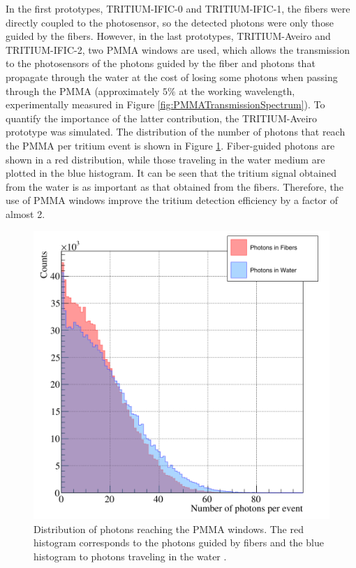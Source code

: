 In the first prototypes, TRITIUM-IFIC-0 and TRITIUM-IFIC-1, the fibers were directly coupled to the photosensor, so the detected photons were only those guided by the fibers. However, in the last prototypes, TRITIUM-Aveiro and TRITIUM-IFIC-2, two PMMA windows are used, which allows the transmission to the photosensors of the photons guided by the fiber and photons that propagate through the water at the cost of losing some photons when passing through the PMMA (approximately $5\%$ at the working wavelength, experimentally measured in Figure \ref{fig:PMMATransmissionSpectrum}). To quantify the importance of the latter contribution, the TRITIUM-Aveiro prototype was simulated. The distribution of the number of photons that reach the PMMA per tritium event is shown in Figure \ref{fig:PMMAEffect}. Fiber-guided photons are shown in a red distribution, while those traveling in the water medium are plotted in the blue histogram. It can be seen that the tritium signal obtained from the water is as important as that obtained from the fibers. Therefore, the use of PMMA windows improve the tritium detection efficiency by a factor of almost 2.

\begin{figure}[hbtp]
\centering
\includegraphics[scale=0.3]{Figures/8SimulationsResults/81TRITIUMDesign/815PMMA/PhotonsDetectedWaterFiber.png}
\caption{Distribution of photons reaching the PMMA windows. The red histogram corresponds to the photons guided by fibers and the blue histogram to photons traveling in the water \cite{SimulationPaperCarlos}.\label{fig:PMMAEffect}}
\end{figure}

